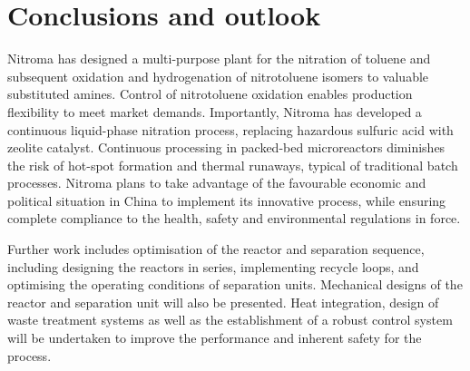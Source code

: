 \section{Conclusions and outlook}
\label{sec:conclu}
Nitroma has designed a multi-purpose plant for the nitration of toluene and subsequent oxidation and hydrogenation of nitrotoluene isomers to valuable substituted amines.
Control of nitrotoluene oxidation enables production flexibility to meet market demands.
Importantly, Nitroma has developed a continuous liquid-phase nitration process, replacing hazardous sulfuric acid with zeolite catalyst.
Continuous processing in packed-bed microreactors diminishes the risk of hot-spot formation and thermal runaways, typical of traditional batch processes.
Nitroma plans to take advantage of the favourable economic and political situation in China to implement its innovative process, while ensuring complete compliance to the health, safety and environmental regulations in force.

Further work includes optimisation of the reactor and separation sequence, including designing the reactors in series, implementing recycle loops, and optimising the operating conditions of separation units. Mechanical designs of the reactor and separation unit will also be presented. Heat integration, design of waste treatment systems as well as the establishment of a robust control system will be undertaken to improve the performance and inherent safety for the process.
